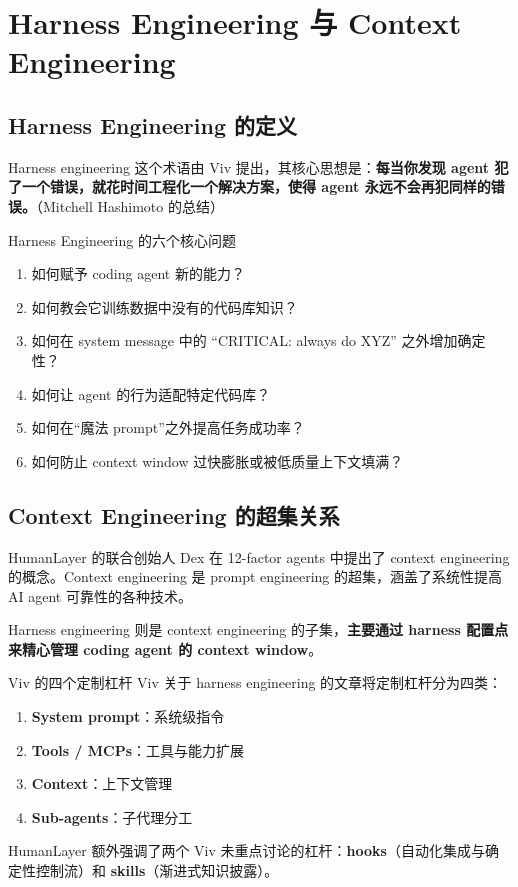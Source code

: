 \section{Harness Engineering 与 Context Engineering}

\subsection{Harness Engineering 的定义}

Harness engineering 这个术语由 Viv 提出，其核心思想是：\textbf{每当你发现 agent 犯了一个错误，就花时间工程化一个解决方案，使得 agent 永远不会再犯同样的错误。}（Mitchell Hashimoto 的总结）

\begin{importantbox}{Harness Engineering 的六个核心问题}
\begin{enumerate}[leftmargin=1.5em]
    \item 如何赋予 coding agent 新的能力？
    \item 如何教会它训练数据中没有的代码库知识？
    \item 如何在 system message 中的 ``CRITICAL: always do XYZ'' 之外增加确定性？
    \item 如何让 agent 的行为适配特定代码库？
    \item 如何在``魔法 prompt''之外提高任务成功率？
    \item 如何防止 context window 过快膨胀或被低质量上下文填满？
\end{enumerate}
\end{importantbox}

\subsection{Context Engineering 的超集关系}

HumanLayer 的联合创始人 Dex 在 12-factor agents 中提出了 context engineering 的概念。Context engineering 是 prompt engineering 的超集，涵盖了系统性提高 AI agent 可靠性的各种技术。

Harness engineering 则是 context engineering 的子集，\textbf{主要通过 harness 配置点来精心管理 coding agent 的 context window}。

\begin{knowledgebox}{Viv 的四个定制杠杆}
Viv 关于 harness engineering 的文章将定制杠杆分为四类：
\begin{enumerate}[leftmargin=1.5em]
    \item \textbf{System prompt}：系统级指令
    \item \textbf{Tools / MCPs}：工具与能力扩展
    \item \textbf{Context}：上下文管理
    \item \textbf{Sub-agents}：子代理分工
\end{enumerate}
HumanLayer 额外强调了两个 Viv 未重点讨论的杠杆：\textbf{hooks}（自动化集成与确定性控制流）和 \textbf{skills}（渐进式知识披露）。
\end{knowledgebox}

